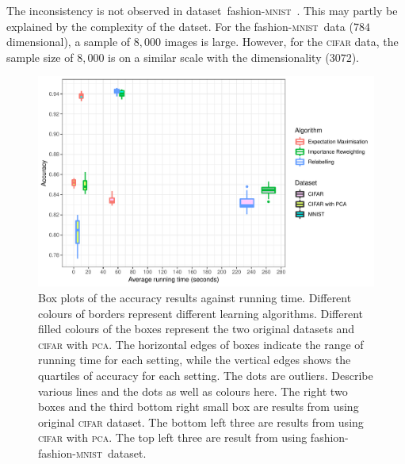 \documentclass[12pt]{article} %
\newcommand{\mnist}{fashion-\textsc{mnist}\ }
\begin{document}
The inconsistency is not observed in dataset~\mnist. This may partly be explained by the complexity of the datset. For the \mnist data ($784$ dimensional), a sample of $8,000$ images is large. However, for the \textsc{cifar} data, the sample size of $8,000$ is on a similar scale with the dimensionality ($3072$).
\begin{figure}
	\centering
    \includegraphics[scale=0.8]{boxplotv}%
	\caption{Box plots of the accuracy results against running time. Different colours of borders represent different learning algorithms. Different filled colours of the boxes represent the two original datasets and \textsc{cifar} with \textsc{pca}. The horizontal edges of boxes indicate the range of running time for each setting, while the vertical edges shows the quartiles of accuracy for each setting. The dots are outliers. {\color{red}Describe various lines and the dots as well as colours here. }
The right two boxes and the third bottom right small box are results from using original \textsc{cifar} dataset. The bottom left three are results from using \textsc{cifar} with \textsc{pca}. The top left three are result from using fashion-\mnist dataset.}
	\label{fig:Boxplot}
\end{figure}

\end{document}
